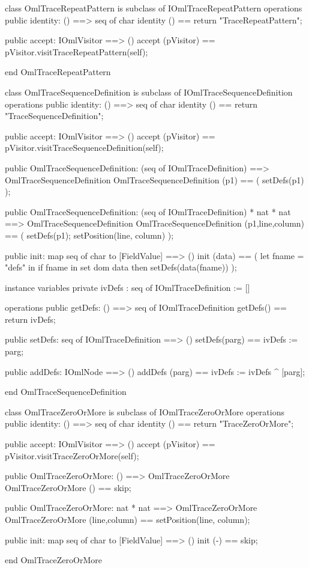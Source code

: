 \begin{vdm_al}
class OmlTraceRepeatPattern is subclass of IOmlTraceRepeatPattern
operations
  public identity: () ==> seq of char
  identity () == return "TraceRepeatPattern";

  public accept: IOmlVisitor ==> ()
  accept (pVisitor) == pVisitor.visitTraceRepeatPattern(self);

end OmlTraceRepeatPattern
\end{vdm_al}
\begin{vdm_al}
class OmlTraceSequenceDefinition is subclass of IOmlTraceSequenceDefinition
operations
  public identity: () ==> seq of char
  identity () == return "TraceSequenceDefinition";

  public accept: IOmlVisitor ==> ()
  accept (pVisitor) == pVisitor.visitTraceSequenceDefinition(self);

  public OmlTraceSequenceDefinition:
    (seq of IOmlTraceDefinition) ==> OmlTraceSequenceDefinition
  OmlTraceSequenceDefinition (p1) == 
    ( setDefs(p1) );

  public OmlTraceSequenceDefinition:
    (seq of IOmlTraceDefinition) *
    nat *
    nat ==> OmlTraceSequenceDefinition
  OmlTraceSequenceDefinition (p1,line,column) == 
    ( setDefs(p1);
      setPosition(line, column) );

  public init: map seq of char to [FieldValue] ==> ()
  init (data) ==
    ( let fname = "defs" in
        if fname in set dom data
        then setDefs(data(fname)) );

instance variables
  private ivDefs : seq of IOmlTraceDefinition := []

operations
  public getDefs: () ==> seq of IOmlTraceDefinition
  getDefs() == return ivDefs;

  public setDefs: seq of IOmlTraceDefinition ==> ()
  setDefs(parg) == ivDefs := parg;

  public addDefs: IOmlNode ==> ()
  addDefs (parg) == ivDefs := ivDefs ^ [parg];

end OmlTraceSequenceDefinition
\end{vdm_al}

\begin{vdm_al}
class OmlTraceZeroOrMore is subclass of IOmlTraceZeroOrMore
operations
  public identity: () ==> seq of char
  identity () == return "TraceZeroOrMore";

  public accept: IOmlVisitor ==> ()
  accept (pVisitor) == pVisitor.visitTraceZeroOrMore(self);

  public OmlTraceZeroOrMore:
    () ==> OmlTraceZeroOrMore
  OmlTraceZeroOrMore () == 
    skip;

  public OmlTraceZeroOrMore:
    nat *
    nat ==> OmlTraceZeroOrMore
  OmlTraceZeroOrMore (line,column) == 
    setPosition(line, column);

  public init: map seq of char to [FieldValue] ==> ()
  init (-) == skip;

end OmlTraceZeroOrMore
\end{vdm_al}

